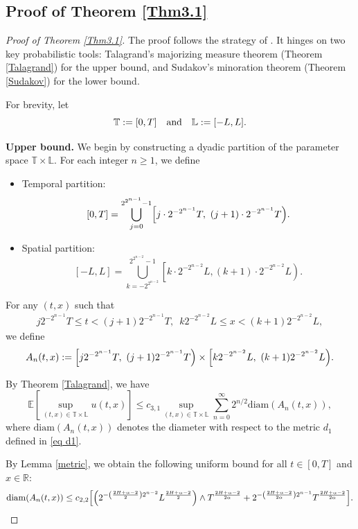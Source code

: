 \documentclass[11pt,reqno]{amsart}
\numberwithin{equation}{section}
\def\bT{\mathbb{T}}
\def\bL{\mathbb{L}}
\def\LL{[-L,L]}
\newcommand{\1}{{\bf 1}}
\newcommand{\2}{{\bf 2}}
\newcommand{\lt}{\left }
\newcommand{\rt}{\right}
\begin{document}
\subsection{Proof of Theorem \ref{Thm3.1}}
 \begin{proof}[Proof of Theorem \ref{Thm3.1}]
The proof follows the strategy of \cite[Theorem 1.1]{HW2022}. It hinges on two key probabilistic tools: Talagrand's majorizing measure theorem (Theorem \ref{Talagrand}) for the upper bound, and Sudakov's minoration theorem (Theorem \ref{Sudakov}) for the lower bound.

 
For  brevity,  let
  \[
 \bT:=[0,T]\quad{\rm and}\quad  \bL:=\LL.
\]


 \noindent \textbf{Upper bound.} We begin by constructing a dyadic partition  of the parameter space $\bT\times \bL$. For each integer $n \geq 1$, we define
\begin{itemize}
 \item  Temporal partition:
\begin{equation}\label{partition:T}
[0,T] = \bigcup_{j=0}^{2^{2^{n-1}}-1} \Bigl[j\cdot 2^{-2^{n-1}}T,\ (j+1)\cdot 2^{-2^{n-1}}T\Bigr).
\end{equation}
 \item  Spatial partition:
\begin{equation}\label{partition:L}
 [-L,L]=\bigcup\limits_{k=-2^{2^{n-2}}}^{2^{2^{n-2}}-1}\lt[k\cdot2^{-2^{n-2}}L,(k+1)\cdot2^{-2^{n-2}}L\rt).
\end{equation}
\end{itemize}
For any $(t,x)$ such  that
\begin{align*}
j  2^{-2^{n-1}}T  \leq t < (j+1)  2^{-2^{n-1}}T, \,\, \,
k  2^{-2^{n-2}}L  \leq x < (k+1)  2^{-2^{n-2}}L,
\end{align*}
we define
\[
A_n(t,x) := \Bigl[j 2^{-2^{n-1}}T,\ (j+1) 2^{-2^{n-1}}T\Bigr) \times \Bigl[k 2^{-2^{n-2}}L,\ (k+1)  2^{-2^{n-2}}L\Bigr).
\]

 By Theorem \ref{Talagrand}, we have
\begin{equation}\label{diam An-1}
    \mathbb{E}\left[\sup_{(t,x)\in\bT \times\bL} u(t,x)\right]
    \leq c_{3,1}\sup_{(t,x)\in\bT \times\bL} \sum_{n=0}^\infty 2^{n/2} \mathrm{diam}(A_n(t,x)),
\end{equation}
where $\mathrm{diam}(A_n(t,x))$ denotes the diameter  with respect to the metric $d_1$ defined in \eqref{eq d1}.

By  Lemma \ref{metric}, we obtain the following uniform bound for all $t \in [0,T]$ and $x \in \mathbb{R}$:
\begin{equation}\label{diam An-2}
\begin{split}
    \mathrm{diam}(A_n(t,x))
    \leq c_{2,2}\Bigl[\left(2^{-\left(\frac{2H+\alpha-2}{2}\right)2^{n-2}} L^{\frac{2H+\alpha-2}{2}}\right)
     \wedge T^{\frac{2H+\alpha-2}{2\alpha}}
    + 2^{-\left(\frac{2H+\alpha-2}{2\alpha}\right)2^{n-1}} T^{\frac{2H+\alpha-2}{2\alpha}}\Bigr].
\end{split}
\end{equation}


\end{proof}
\end{document}
